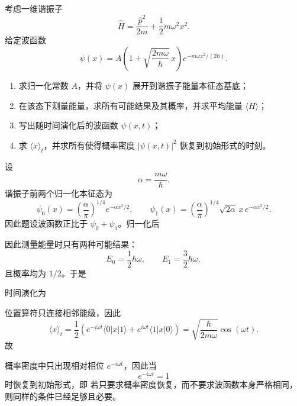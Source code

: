 ﻿

\begin{question}
考虑一维谐振子
\[
\hat H=\frac{\hat p^2}{2m}+\frac12 m\omega^2 x^2.
\]
给定波函数
\[
\psi(x)=A\left(1+\sqrt{\frac{2m\omega}{\hbar}}\,x\right)e^{-m\omega x^2/(2\hbar)}.
\]

\begin{enumerate}[label=(\arabic*),leftmargin=2.5em]
  \item 求归一化常数 $A$，并将 $\psi(x)$ 展开到谐振子能量本征态基底；
  \item 在该态下测量能量，求所有可能结果及其概率，并求平均能量 $\langle H\rangle$；
  \item 写出随时间演化后的波函数 $\psi(x,t)$；
  \item 求 $\langle x\rangle_t$，并求所有使得概率密度 $|\psi(x,t)|^2$ 恢复到初始形式的时刻。
\end{enumerate}

\begin{solution}
设
\[
\alpha=\frac{m\omega}{\hbar}.
\]
谐振子前两个归一化本征态为
\[
\psi_0(x)=\left(\frac{\alpha}{\pi}\right)^{1/4}e^{-\alpha x^2/2},
\qquad
\psi_1(x)=\left(\frac{\alpha}{\pi}\right)^{1/4}\sqrt{2\alpha}\,x\,e^{-\alpha x^2/2}.
\]
因此题设波函数正比于 $\psi_0+\psi_1$。归一化后

因此测量能量时只有两种可能结果：
\[
E_0=\frac12\hbar\omega,
\qquad
E_1=\frac32\hbar\omega,
\]
且概率均为 $1/2$。于是

时间演化为

位置算符只连接相邻能级，因此
\[
\langle x\rangle_t=\frac12\left(e^{-i\omega t}\langle 0|x|1\rangle+e^{i\omega t}\langle 1|x|0\rangle\right)
=\sqrt{\frac{\hbar}{2m\omega}}\cos(\omega t).
\]
故

概率密度中只出现相对相位 $e^{-i\omega t}$，因此当
\[
e^{-i\omega t}=1
\]
时恢复到初始形式，即
若只要求概率密度恢复，而不要求波函数本身严格相同，则同样的条件已经足够且必要。
\end{solution}
\end{question}

